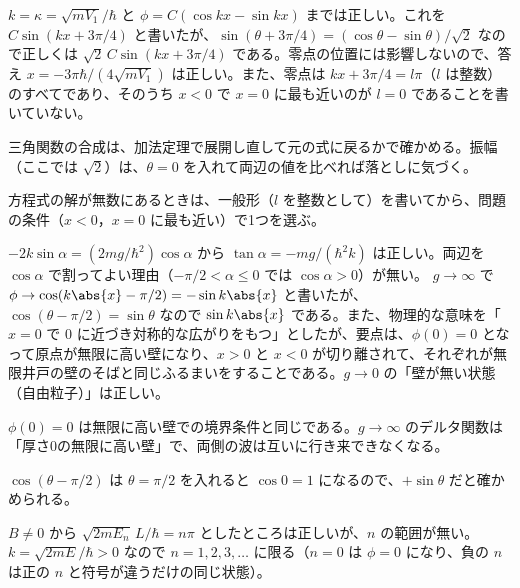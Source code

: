 \begin{kotaeran}
   $k=\kappa=\sqrt{mV_{1}}/\hbar$ と $\phi=C(\cos kx-\sin kx)$ までは正しい。これを $C\sin(kx+3\pi/4)$ と書いたが、$\sin(\theta+3\pi/4)=(\cos\theta-\sin\theta)/\sqrt{2}$ なので正しくは $\sqrt{2}\,C\sin(kx+3\pi/4)$ である。零点の位置には影響しないので、答え $x=-3\pi\hbar/(4\sqrt{mV_{1}})$ は正しい。また、零点は $kx+3\pi/4=l\pi$（$l$ は整数）のすべてであり、そのうち $x<0$ で $x=0$ に最も近いのが $l=0$ であることを書いていない。
\end{kotaeran}
\begin{rikai}
  \item 三角関数の合成は、加法定理で展開し直して元の式に戻るかで確かめる。振幅（ここでは $\sqrt{2}$）は、$\theta=0$ を入れて両辺の値を比べれば落としに気づく。
  \item 方程式の解が無数にあるときは、一般形（$l$ を整数として）を書いてから、問題の条件（$x<0$，$x=0$ に最も近い）で1つを選ぶ。
\end{rikai}
\begin{kotaeran}
   $-2k\sin\alpha=(2mg/\hbar^{2})\cos\alpha$ から $\tan\alpha=-mg/(\hbar^{2}k)$ は正しい。両辺を $\cos\alpha$ で割ってよい理由（$-\pi/2<\alpha\le0$ では $\cos\alpha>0$）が無い。
   $g\to\infty$ で $\phi\to\cos(k\abs{x}-\pi/2)=-\sin k\abs{x}$ と書いたが、$\cos(\theta-\pi/2)=\sin\theta$ なので $\sin k\abs{x}$ である。また、物理的な意味を「$x=0$ で $0$ に近づき対称的な広がりをもつ」としたが、要点は、$\phi(0)=0$ となって原点が無限に高い壁になり、$x>0$ と $x<0$ が切り離されて、それぞれが無限井戸の壁のそばと同じふるまいをすることである。$g\to0$ の「壁が無い状態（自由粒子）」は正しい。
\end{kotaeran}
\begin{rikai}
  \item $\phi(0)=0$ は無限に高い壁での境界条件と同じである。$g\to\infty$ のデルタ関数は「厚さ0の無限に高い壁」で、両側の波は互いに行き来できなくなる。
  \item $\cos(\theta-\pi/2)$ は $\theta=\pi/2$ を入れると $\cos0=1$ になるので、$+\sin\theta$ だと確かめられる。
\end{rikai}
\begin{kotaeran}
   $B\neq0$ から $\sqrt{2mE_{n}}\,L/\hbar=n\pi$ としたところは正しいが、$n$ の範囲が無い。$k=\sqrt{2mE}/\hbar>0$ なので $n=1,2,3,\dots$ に限る（$n=0$ は $\phi=0$ になり、負の $n$ は正の $n$ と符号が違うだけの同じ状態）。
\end{kotaeran}
